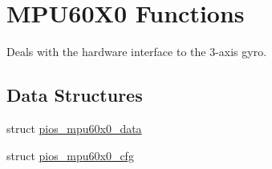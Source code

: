 \hypertarget{group___p_i_o_s___m_p_u60_x0}{\section{M\-P\-U60\-X0 Functions}
\label{group___p_i_o_s___m_p_u60_x0}
}


Deals with the hardware interface to the 3-\/axis gyro.  


\subsection*{Data Structures}
\begin{DoxyCompactItemize}
\item 
struct \hyperlink{structpios__mpu60x0__data}{pios\-\_\-mpu60x0\-\_\-data}
\item 
struct \hyperlink{structpios__mpu60x0__cfg}{pios\-\_\-mpu60x0\-\_\-cfg}
\end{DoxyCompactItemize}
